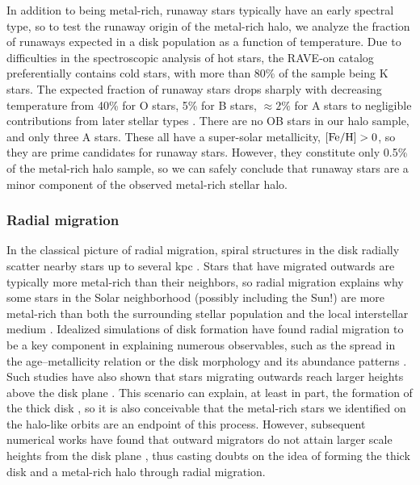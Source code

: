 \documentclass[apj, twocolappendix, numberedappendix, appendixfloats]{emulateapj}
\begin{document}
In addition to being metal-rich, runaway stars typically have an early spectral type, so to test the runaway origin of the metal-rich halo, we analyze the fraction of runaways expected in a disk population as a function of temperature.
Due to difficulties in the spectroscopic analysis of hot stars, the RAVE-on catalog preferentially contains cold stars, with more than 80\% of the sample being K stars.
The expected fraction of runaway stars drops sharply with decreasing temperature from 40\% for O stars, 5\% for B stars, $\approx2\%$ for A stars to negligible contributions from later stellar types \citep{blaauw1961, gies1986, bromley2009, perets2012}.
There are no OB stars in our halo sample, and only three A stars.
These all have a super-solar metallicity, $\rm[Fe/H]>0$, so they are prime candidates for runaway stars.
However, they constitute only 0.5\% of the metal-rich halo sample, so we can safely conclude that runaway stars are a minor component of the observed metal-rich stellar halo.

\subsubsection{Radial migration}
\label{sec:migration}
In the classical picture of radial migration, spiral structures in the disk radially scatter nearby stars up to several kpc \citep{sellwood2002}.
Stars that have migrated outwards are typically more metal-rich than their neighbors, so radial migration explains why some stars in the Solar neighborhood (possibly including the Sun!) are more metal-rich than both the surrounding stellar population and the local interstellar medium \citep{wielen1996}.
Idealized simulations of disk formation have found radial migration to be a key component in explaining numerous observables, such as the spread in the age--metallicity relation \citep{roskar2008} or the disk morphology and its abundance patterns \citep{schonrich2009}.
Such studies have also shown that stars migrating outwards reach larger heights above the disk plane \citep[e.g.,][]{schonrich2009, loebman2011}.
This scenario can explain, at least in part, the formation of the thick disk \citep[e.g.,][]{wilson2011}, so it is also conceivable that the metal-rich stars we identified on the halo-like orbits are an endpoint of this process.
However, subsequent numerical works have found that outward migrators do not attain larger scale heights from the disk plane \citep{minchev2012, vera-ciro2014}, thus casting doubts on the idea of forming the thick disk and a metal-rich halo through radial migration.
\end{document}
